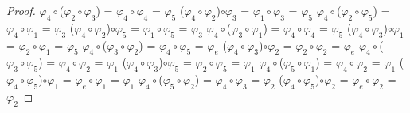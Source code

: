 \documentclass[10pt,a4paper,oneside]{article}
\begin{document}
\begin{proof}
					$\varphi_{4}\circ$($\varphi_{2}\circ\varphi_{3}$) = $\varphi_{4}\circ\varphi_{4}$ = $\varphi_{5}$
					\newline
					($\varphi_{4}\circ\varphi_{2}$)$\circ\varphi_{3}$ = $\varphi_{1}\circ\varphi_{3}$ = $\varphi_{5}$
					\newline
					\newline
					$\varphi_{4}\circ$($\varphi_{2}\circ\varphi_{5}$) = $\varphi_{4}\circ\varphi_{1}$ = $\varphi_{3}$
					\newline
					($\varphi_{4}\circ\varphi_{2}$)$\circ\varphi_{5}$ = $\varphi_{1}\circ\varphi_{5}$ = $\varphi_{3}$
					\newline
					\newline
					$\varphi_{4}\circ$($\varphi_{3}\circ\varphi_{1}$) = $\varphi_{4}\circ\varphi_{4}$ = $\varphi_{5}$
					\newline
					($\varphi_{4}\circ\varphi_{3}$)$\circ\varphi_{1}$ = $\varphi_{2}\circ\varphi_{1}$ = $\varphi_{5}$
					\newline
					\newline
					$\varphi_{4}\circ$($\varphi_{3}\circ\varphi_{2}$) = $\varphi_{4}\circ\varphi_{5}$ = $\varphi_{e}$
					\newline
					($\varphi_{4}\circ\varphi_{3}$)$\circ\varphi_{2}$ = $\varphi_{2}\circ\varphi_{2}$ = $\varphi_{e}$
					\newline
					\newline
					$\varphi_{4}\circ$($\varphi_{3}\circ\varphi_{5}$) = $\varphi_{4}\circ\varphi_{2}$ = $\varphi_{1}$
					\newline
					($\varphi_{4}\circ\varphi_{3}$)$\circ\varphi_{5}$ = $\varphi_{2}\circ\varphi_{5}$ = $\varphi_{1}$
					\newline
					\newline
					$\varphi_{4}\circ$($\varphi_{5}\circ\varphi_{1}$) = $\varphi_{4}\circ\varphi_{2}$ = $\varphi_{1}$
					\newline
					($\varphi_{4}\circ\varphi_{5}$)$\circ\varphi_{1}$ = $\varphi_{e}\circ\varphi_{1}$ = $\varphi_{1}$
					\newline
					\newline
					$\varphi_{4}\circ$($\varphi_{5}\circ\varphi_{2}$) = $\varphi_{4}\circ\varphi_{3}$ = $\varphi_{2}$
					\newline
					($\varphi_{4}\circ\varphi_{5}$)$\circ\varphi_{2}$ = $\varphi_{e}\circ\varphi_{2}$ = $\varphi_{2}$
					\newline
					\newline

\end{proof}
\end{document}
